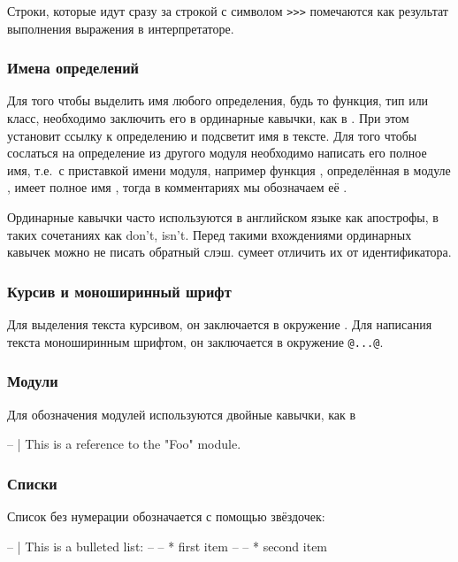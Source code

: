 Строки, которые идут сразу за строкой с символом \verb!>>>! 
помечаются как результат выполнения выражения в интерпретаторе.


\subsubsection{Имена определений}

Для того чтобы выделить имя любого определения, будь то
функция, тип или класс, необходимо заключить его в ординарные
кавычки, как в . При этом  установит
ссылку к определению и подсветит имя в тексте. 
Для того чтобы сослаться на определение из другого
модуля необходимо написать его полное имя, т.е.~с приставкой
имени модуля, например 
функция , определённая в модуле , имеет
полное имя , тогда в комментариях мы обозначаем
её . 

Ординарные кавычки часто используются в английском языке
как апострофы, в таких сочетаниях как don't, isn't. 
Перед такими вхождениями ординарных кавычек можно не писать
обратный слэш.  сумеет отличить их от идентификатора.

\subsubsection{Курсив и моноширинный шрифт}

Для выделения текста курсивом, он заключается в окружение
. Для написания текста моноширинным шрифтом,
он заключается в окружение \verb!@...@!.


\subsubsection{Модули}

Для обозначения модулей используются двойные кавычки, как в 

\begin{code}
-- | This is a reference to the "Foo" module.
\end{code}

\subsubsection{Списки}

Список без нумерации обозначается с помощью звёздочек:

\begin{code}
-- | This is a bulleted list:
--
--     * first item
--
--     * second item
\end{code}

